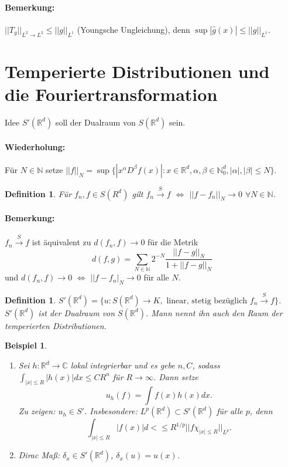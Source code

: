 \documentclass[12pt]{extreport} %
\newtheorem{Definition}[Satz]{Definition}
\newtheorem{Beispiel}[Satz]{Beispiel}
\numberwithin{equation}{section}
\newcommand{\C}{\mathbb{C}} %
\newcommand{\R}{\mathbb{R}} %
\newcommand{\N}{\mathbb{N}} %
\newcommand{\g}{\hat{g}}
\begin{document}
	\paragraph{Bemerkung:} $||T_g||_{L^2\rightarrow L^2}\leq||g||_{L^1}$ (Youngsche Ungleichung), denn $\sup|\g(x)| \leq ||g||_{L^1}$.
	
	\section{Temperierte Distributionen und die Fouriertransformation}
	
	Idee $S'(\R^d)$ soll der Dualraum von $S(\R^d)$ sein. 
	\paragraph{Wiederholung:} Für $N\in \N$ setze $||f||_N = \sup\{|x^\alpha D^\beta f(x)|: x\in \R^d, \alpha,\beta\in \N_0^d, |\alpha|,|\beta|\leq N \}$.
	
	\begin{Definition}
		Für $f_n,f\in S(R^d)$ gilt $f_n\overset{S}{\rightarrow}f$ $\Leftrightarrow$ $||f-f_n||_N\rightarrow 0$ $\forall N\in \N$.
	\end{Definition}
	
	\paragraph{Bemerkung:} $f_n\overset{S}{\rightarrow} f$ ist äquivalent zu $d(f_n,f)\rightarrow 0$ für die Metrik
	$$d(f,g)=\sum_{N\in \N}2^{-N}\frac{||f-g||_N}{1+||f-g||_N}$$
	und $d(f_n,f)\rightarrow 0$ $\Leftrightarrow$ $||f-f_n|_N\rightarrow 0$ für alle $N$.
	
	\begin{Definition}
		$S'(\R^d) = \{u:S(\R^d)\rightarrow K, \text{ linear, stetig bezüglich } f_n\overset{S}{\rightarrow} f \}$. $S'(\R^d)$ ist der Dualraum von $S(\R^d)$. Mann nennt ihn auch den Raum der temperierten Distributionen.
	\end{Definition}
	
	\begin{Beispiel}
		~
		\begin{enumerate}
			\item[a)] Sei $h:\R^d\rightarrow \C$ lokal integrierbar und es gebe $n,C$, sodass $\int_{|x|\leq R}|h(x)|dx\leq C R^n$ für $R\rightarrow \infty$. Dann setze $$u_h(f) = \int f(x)h(x) dx.$$
			Zu zeigen: $u_h\in S'$. Insbesondere: $L^p(\R^d)\subset S'(\R^d)$ für alle $p$, denn 
			$$\int_{|x|\leq R}|f(x)|d<\leq R^{1/p}||f\chi_{|x|\leq R}||_{L^p}.$$
			\item[b)] Dirac Maß: $\delta_x\in S'(\R^d)$, $\delta_x(u) = u(x)$.
		\end{enumerate}
	\end{Beispiel}
	
\end{document}
